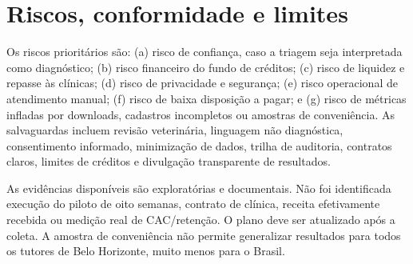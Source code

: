 \section{Riscos, conformidade e limites}
Os riscos prioritários são: (a) risco de confiança, caso a triagem seja interpretada como diagnóstico; (b) risco financeiro do fundo de créditos; (c) risco de liquidez e repasse às clínicas; (d) risco de privacidade e segurança; (e) risco operacional de atendimento manual; (f) risco de baixa disposição a pagar; e (g) risco de métricas infladas por downloads, cadastros incompletos ou amostras de conveniência. As salvaguardas incluem revisão veterinária, linguagem não diagnóstica, consentimento informado, minimização de dados, trilha de auditoria, contratos claros, limites de créditos e divulgação transparente de resultados.

As evidências disponíveis são exploratórias e documentais. Não foi identificada execução do piloto de oito semanas, contrato de clínica, receita efetivamente recebida ou medição real de CAC/retenção. O plano deve ser atualizado após a coleta. A amostra de conveniência não permite generalizar resultados para todos os tutores de Belo Horizonte, muito menos para o Brasil.